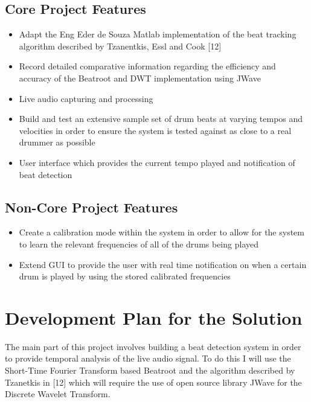 \documentclass[a4paper, 11pt]{article}
\begin{document}
\subsection{Core Project Features}
\begin{itemize}
\item Adapt the Eng Eder de Souza Matlab implementation of the beat tracking algorithm described by Tzanentkis, Essl and Cook [12] 
\item Record detailed comparative information regarding the efficiency and accuracy of the Beatroot and DWT implementation using JWave
\item Live audio capturing and processing
\item Build and test an extensive sample set of drum beats at varying tempos and velocities in order to ensure the system is tested against as close to a real drummer as possible
\item User interface which provides the current tempo played and notification of beat detection
\end{itemize}

\subsection{Non-Core Project Features}
\begin{itemize}
\item Create a calibration mode within the system in order to allow for the system to learn the relevant frequencies of all of the drums being played
\item Extend GUI to provide the user with real time notification on when a certain drum is played by using the stored calibrated frequencies
\end{itemize}

\maketitle{} 
\section{Development Plan for the Solution}

The main part of this project involves building a beat detection system in order to provide temporal analysis of the live audio signal. To do this I will use the Short-Time Fourier Transform based Beatroot and the algorithm described by Tzanetkis in [12] which will require the use of open source library JWave for the Discrete Wavelet Transform. 
\end{document}

